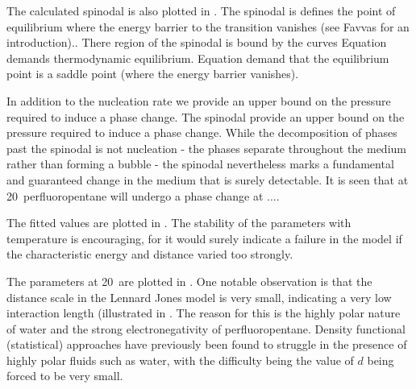 The calculated spinodal is also plotted in .
The spinodal is defines the point of equilibrium where the energy barrier to the transition vanishes (see Favvas\cite{Favvas2008} for an introduction)..
There region of the spinodal is bound by the curves
Equation   demands thermodynamic equilibrium.
Equation      demand that the equilibrium point is a saddle point (where the energy barrier vanishes).

In addition to the nucleation rate we provide an upper bound on the pressure required to induce a phase change.
The spinodal provide an upper bound on the pressure required to induce a phase change.
While the decomposition of phases past the spinodal is not  nucleation -
the phases separate throughout the medium rather than forming a bubble -
the spinodal nevertheless marks a fundamental and guaranteed  change in the medium that is surely detectable.
It is seen that at \unit{20}\degree\ perfluoropentane will undergo a phase change at ....

The fitted values are plotted in .
The stability of the parameters with temperature is encouraging,
for it would surely indicate a failure in the model if the characteristic energy and distance 
varied too strongly.

The parameters at \unit{20}\degree\ are plotted in .
One notable observation is that the distance scale in the Lennard Jones model is very small,
indicating a very low interaction length (illustrated in .
The reason for this is the highly polar nature of water and the strong electronegativity of perfluoropentane.
Density functional (statistical) approaches have previously been found to struggle in the presence of highly polar fluids such as water\cite{Talanquer2001, Nyquist1995},
with the difficulty being the value of $d$ being forced to be very small.






